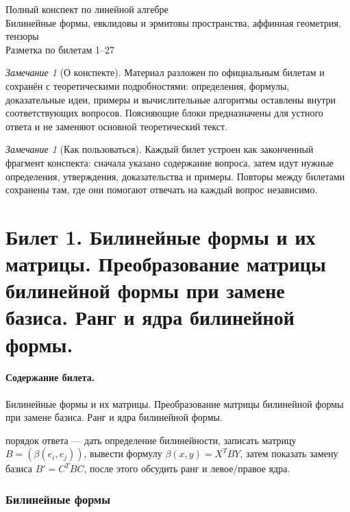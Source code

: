 \documentclass[12pt,a4paper]{article}
\theoremstyle{definition}
\theoremstyle{plain}
\theoremstyle{remark}
\newtheorem{remark}[definition]{Замечание}
\newenvironment{planadd}{\begin{planbox}}{\end{planbox}}
\begin{document}
\begin{center}
{\LARGE Полный конспект по линейной алгебре}\\[3pt]
{\large Билинейные формы, евклидовы и эрмитовы пространства, аффинная геометрия, тензоры}\\[4pt]
{\normalsize Разметка по билетам 1--27}
\end{center}

\begin{remark}[О конспекте]
Материал разложен по официальным билетам и сохранён с теоретическими подробностями: определения, формулы, доказательные идеи, примеры и вычислительные алгоритмы оставлены внутри соответствующих вопросов. Поясняющие блоки предназначены для устного ответа и не заменяют основной теоретический текст.
\end{remark}

\begin{remark}[Как пользоваться]
Каждый билет устроен как законченный фрагмент конспекта: сначала указано содержание вопроса, затем идут нужные определения, утверждения, доказательства и примеры. Повторы между билетами сохранены там, где они помогают отвечать на каждый вопрос независимо.
\end{remark}

\tableofcontents
\clearpage
\section{Билет 1. Билинейные формы и их матрицы. Преобразование матрицы билинейной формы при замене базиса. Ранг и ядра билинейной формы.}

\paragraph{Содержание билета.} Билинейные формы и их матрицы. Преобразование матрицы билинейной формы при замене базиса. Ранг и ядра билинейной формы.

\begin{planadd}

порядок ответа — дать определение билинейности, записать матрицу $B=(\beta(e_i,e_j))$, вывести формулу $\beta(x,y)=X^TBY$, затем показать замену базиса $B' = C^TBC$, после этого обсудить ранг и левое/правое ядра.

\end{planadd}

\subsubsection{Билинейные формы}
\end{document}
